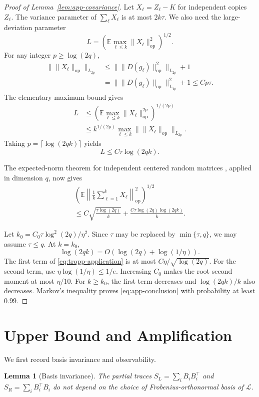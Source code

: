 \documentclass[twoside]{article}
\newtheorem{lemma}[theorem]{Lemma}
\newcommand{\E}{\mathbb E}
\newcommand{\op}{\mathrm{op}}
\newcommand{\cL}{\mathcal L}
\begin{document}
\begin{proof}[Proof of Lemma~\ref{lem:app-covariance}]
Let $X_\ell=Z_\ell-K$ for independent copies $Z_\ell$. The variance
parameter of $\sum_\ell X_\ell$ is at most $2k\tau$. We also need the
large-deviation parameter
\[
 L=\left(\E\max_{\ell\le k}\|X_\ell\|_\op^2\right)^{1/2}.
\]
For any integer $p\ge\log(2q)$,
\begin{align*}
 \|\|X_\ell\|_\op\|_{L_{2p}}
 &\le \|\|D(g_\ell)\|_\op^2\|_{L_{2p}}+1\\
 &=\|\|D(g_\ell)\|_\op\|_{L_{4p}}^2+1
 \le Cp\tau.
\end{align*}
The elementary maximum bound gives
\begin{align*}
 L
 &\le\left(\E\max_{\ell\le k}\|X_\ell\|_\op^{2p}
 \right)^{1/(2p)}\\
 &\le k^{1/(2p)}\max_{\ell\le k}
 \|\|X_\ell\|_\op\|_{L_{2p}}.
\end{align*}
Taking $p=\lceil\log(2qk)\rceil$ yields
\begin{equation}
 L\le C\tau\log(2qk).
 \label{eq:large-deviation}
\end{equation}

The expected-norm theorem for independent centered random matrices
\citep[Theorem I]{tropp2015expected}, applied in dimension $q$, now gives
\begin{multline}
 \left(\E\left\|\frac1k\sum_{\ell=1}^kX_\ell\right\|_\op^2
 \right)^{1/2}\\
 \le C\sqrt{\frac{\tau\log(2q)}{k}}
 +\frac{C\tau\log(2q)\log(2qk)}{k}.
 \label{eq:tropp-application}
\end{multline}

Let $k_0=C_0\tau\log^2(2q)/\eta^2$. Since $\tau$ may be replaced by
$\min\{\tau,q\}$, we may assume $\tau\le q$. At $k=k_0$,
\[
 \log(2qk)=O(\log(2q)+\log(1/\eta)).
\]
The first term of \eqref{eq:tropp-application} is at most $C\eta/\sqrt{\log(2q)}$.
For the second term, use
$\eta\log(1/\eta)\le1/e$. Increasing $C_0$ makes the root second moment at
most $\eta/10$. For $k\ge k_0$, the first term decreases and
$\log(2qk)/k$ also decreases. Markov's inequality proves
\eqref{eq:app-conclusion} with probability at least $0.99$.
\end{proof}

\section{Upper Bound and Amplification}
\label{app:upper}

We first record basis invariance and observability.

\begin{lemma}[Basis invariance]
\label{lem:basis}
The partial traces
$S_L=\sum_iB_iB_i^\top$ and $S_R=\sum_iB_i^\top B_i$ do not depend on the
choice of Frobenius-orthonormal basis of $\cL$.
\end{lemma}
\end{document}
